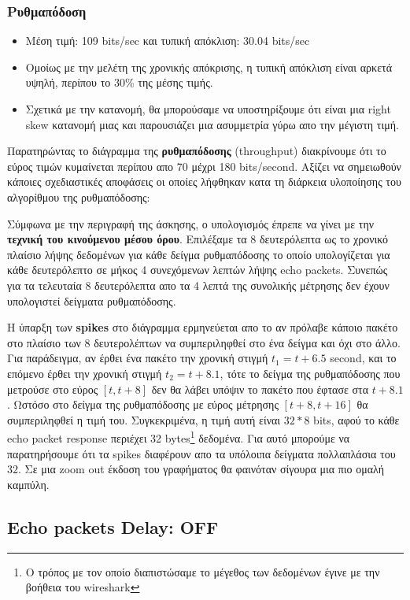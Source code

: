 \documentclass[hidelinks, 12pt, a4paper]{article}
\begin{document}
\subsubsection{Ρυθμαπόδοση}

\begin{itemize}
    \item Μέση τιμή: 109 bits/sec και τυπική απόκλιση: 30.04 bits/sec
    \item Ομοίως με την μελέτη της χρονικής απόκρισης, η τυπική απόκλιση είναι αρκετά υψηλή, περίπου το 30\% της μέσης τιμής.
    \item Σχετικά με την κατανομή, θα μπορούσαμε να υποστηρίξουμε ότι είναι μια right skew κατανομή μιας και παρουσιάζει μια ασυμμετρία γύρω απο την μέγιστη τιμή.
\end{itemize}
Παρατηρώντας το διάγραμμα της \textbf{ρυθμαπόδοσης} (throughput) διακρίνουμε ότι το εύρος τιμών κυμαίνεται περίπου απο 70 μέχρι 180 bits/second. Αξίζει να σημειωθούν κάποιες σχεδιαστικές αποφάσεις οι οποίες λήφθηκαν κατα τη διάρκεια υλοποίησης του αλγορίθμου της ρυθμαπόδοσης:

Σύμφωνα με την περιγραφή της άσκησης, ο υπολογισμός έπρεπε να γίνει με την \textbf{τεχνική του κινούμενου μέσου όρου}. Επιλέξαμε τα 8 δευτερόλεπτα ως το χρονικό πλαίσιο λήψης δεδομένων για κάθε δείγμα ρυθμαπόδοσης το οποίο υπολογίζεται για κάθε δευτερόλεπτο σε μήκος 4 συνεχόμενων λεπτών λήψης echo packets. Συνεπώς για τα τελευταία 8 δευτερόλεπτα απο τα 4 λεπτά της συνολικής μέτρησης δεν έχουν υπολογιστεί δείγματα ρυθμαπόδοσης. 

Η ύπαρξη των \textbf{spikes} στο διάγραμμα ερμηνεύεται απο το αν πρόλαβε κάποιο πακέτο στο πλαίσιο των 8 δευτερολέπτων να συμπεριληφθεί στο ένα δείγμα και όχι στο άλλο. Για παράδειγμα, αν έρθει ένα πακέτο την χρονική στιγμή $t_1 = t + 6.5$ second, και το επόμενο έρθει την χρονική στιγμή $t_2 = t + 8.1$, τότε το δείγμα της ρυθμαπόδοσης που μετρούσε στο εύρος $[t, t+8]$ δεν θα λάβει υπόψιν το πακέτο που έφτασε στα $t + 8.1$. Ωστόσο στο δείγμα της ρυθμαπόδοσης με εύρος μέτρησης $[t+8, t+16]$ θα συμπεριληφθεί η τιμή του. Συγκεκριμένα, η τιμή αυτή είναι $32*8$ bits, αφού το κάθε echo packet response περιέχει 32 bytes\footnote{Ο τρόπος με τον οποίο διαπιστώσαμε το μέγεθος των δεδομένων έγινε με την βοήθεια του wireshark} δεδομένα. Για αυτό μπορούμε να παρατηρήσουμε ότι τα spikes διαφέρουν απο τα υπόλοιπα δείγματα πολλαπλάσια του $32$. Σε μια zoom out έκδοση του γραφήματος θα φαινόταν σίγουρα μια πιο ομαλή καμπύλη.


\subsection{Echo packets Delay: OFF}
\end{document}
